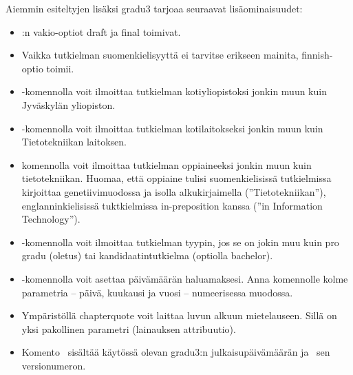 \documentclass[utf8]{gradu3}
\begin{document}
Aiemmin esiteltyjen lisäksi gradu3 tarjoaa seuraavat lisäominaisuudet:
\begin{itemize}
\item \LaTeXe:n vakio-optiot draft ja final toimivat.
\item Vaikka tutkielman suomenkielisyyttä ei tarvitse erikseen
  mainita, finnish-optio toimii.
\item \string\university-komennolla voit ilmoittaa tutkielman
  kotiyliopistoksi jonkin muun kuin Jyväskylän yliopiston.
\item  \string\department-komennolla voit ilmoittaa tutkielman
  kotilaitokseksi jonkin muun kuin Tietotekniikan laitoksen.
\item \string\subject-komennolla voit ilmoittaa tutkielman
  oppiaineeksi jonkin muun kuin tietotekniikan.  Huomaa, että oppiaine
  tulisi suomenkielisissä tutkielmissa kirjoittaa genetiivimuodossa ja
  isolla alkukirjaimella (''Tietotekniikan''), englanninkielisissä
  tuktkielmissa in-preposition kanssa (''in Information Technology'').
\item \string\type-komennolla voit ilmoittaa tutkielman tyypin, jos se
  on jokin muu kuin pro gradu (oletus) tai kandidaatintutkielma
  (optiolla bachelor).
\item \string\setdate-komennolla voit asettaa päivämäärän
  haluamaksesi.  Anna komennolle kolme parametria -- päivä,
  kuukausi ja vuosi -- numeerisessa muodossa.
\item Ympäristöllä chapterquote voit laittaa luvun alkuun
  mietelauseen.  Sillä on yksi pakollinen parametri (lainauksen
  attribuutio).
\item Komento \string\graduclsdate\ sisältää käytössä olevan gradu3:n
  julkaisupäivämäärän ja \string\graduclsversion\ sen versionumeron.
\end{itemize}
\end{document}
